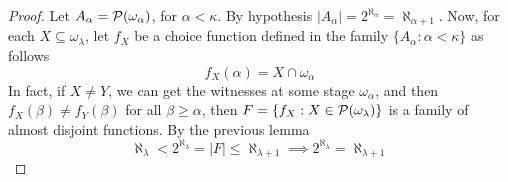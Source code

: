 \begin{proof}
    Let $A_\alpha=\mathcal{P}(\omega_\alpha)$, for $\alpha<\kappa$. By hypothesis $\lvert A_\alpha\rvert=2^{\aleph_\alpha}=\aleph_{\alpha+1}$. Now, for each $X\subseteq\omega_\lambda$, let $f_X$ be a choice function defined in the family $\{A_\alpha:\alpha<\kappa\}$ as follows
    $$f_X(\alpha)=X\cap\omega_\alpha$$
    In fact, if $X\neq Y$, we can get the witnesses at some stage $\omega_\alpha$, and then $f_X(\beta)\neq f_Y(\beta)$ for all $\beta\geq\alpha$, then $F=\{f_X:X\in\mathcal{P}(\omega_\lambda)\}$ is a family of almost disjoint functions. By the previous lemma
    $$\aleph_\lambda<2^{\aleph_\lambda}=\lvert F\rvert\leq\aleph_{\lambda+1}\implies 2^{\aleph_\lambda}=\aleph_{\lambda+1}$$
\end{proof}

